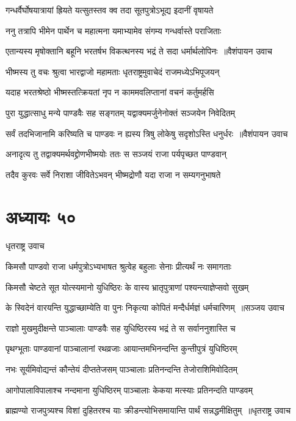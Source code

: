 \twolineshloka
{गन्धर्वैर्घोषयात्रायां ह्रियते यत्सुतस्तव}
{क्व तदा सूतपुत्रोऽभूद्य इदानीं वृषायते}


\twolineshloka
{ननु तत्रापि भीमेन पार्थेन च महात्मना}
{यमाभ्यामेव संगम्य गन्धर्वास्ते पराजिताः}


\threelineshloka
{एतान्यस्य मृषोक्तानि बहूनि भरतर्षभ}
{विकत्थनस्य भद्रं ते सदा धर्मार्थलोपिनः ॥वैशंपायन उवाच}
{}


\twolineshloka
{भीष्मस्य तु वचः श्रुत्वा भारद्वाजो महामताः}
{धृतराष्ट्रमुवाचेदं राजमध्येऽभिपूजयन्}


\twolineshloka
{यदाह भरतश्रेष्ठो भीष्मस्तत्क्रियतां नृप}
{न काममवलिप्तानां वचनं कर्तुमर्हसि}


\twolineshloka
{पुरा युद्धात्साधु मन्ये पाण्डवैः सह सङ्गतम्}
{यद्वाक्यमर्जुनेनोक्तं सञ्जयेन निवेदितम्}


\threelineshloka
{सर्वं तदभिजानामि करिष्यति च पाण्डवः}
{न ह्यस्य त्रिषु लोकेषु सदृशोऽस्ति धनुर्धरः ॥वैशंपायन उवाच}
{}


\twolineshloka
{अनादृत्य तु तद्वाक्यमर्थवद्द्रोणभीष्मयोः}
{ततः स सञ्जयं राजा पर्यपृच्छत पाण्डवान्}


\twolineshloka
{तदैव कुरवः सर्वे निराशा जीवितेऽभवन्}
{भीष्मद्रोणौ यदा राजा न सम्यगनुभाषते}


\chapter{अध्यायः ५०}
\twolineshloka
{धृतराष्ट्र उवाच}
{}


\twolineshloka
{किमसौ पाण्डवो राजा धर्मपुत्रोऽभ्यभाषत}
{श्रुत्वेह बहुलाः सेनाः प्रीत्यर्थं नः समागताः}


\twolineshloka
{किमसौ चेष्टते सूत योत्स्यमानो युधिष्ठिरः}
{के वास्य भ्रातृपुत्राणां पश्यन्त्याज्ञेप्सवो सुखम्}


\threelineshloka
{के स्विदेनं वारयन्ति युद्धाच्छाम्येति वा पुनः}
{निकृत्या कोपितं मन्दैर्धर्मज्ञं धर्मचारिणम् ॥सञ्जय उवाच}
{}


\twolineshloka
{राज्ञो मुखमुदीक्षन्ते पाञ्चालाः पाण्डवैः सह}
{युधिष्ठिरस्य भद्रं ते स सर्वाननुशास्ति च}


\twolineshloka
{पृथग्भूताः पाण्डवानां पाञ्चालानां रथव्रजाः}
{आयान्तमभिनन्दन्ति कुन्तीपुत्रं युधिष्ठिरम्}


\twolineshloka
{नभः सूर्यमिवोद्यन्तं कौन्तेयं दीप्ततेजसम्}
{पाञ्चालाः प्रतिनन्दन्ति तेजोराशिमिवोदितम्}


\twolineshloka
{आगोपालाविपालाश्च नन्दमाना युधिष्ठिरम्}
{पाञ्चालाः केकया मत्स्याः प्रतिनन्दति पाण्डवम्}


\threelineshloka
{ब्राह्मण्यो राजपुत्र्यश्च विशां दुहितरश्च याः}
{क्रीडन्त्योभिसमायान्ति पार्थं सन्नद्धमीक्षितुम् ॥धृतराष्ट्र उवाच}
{}


